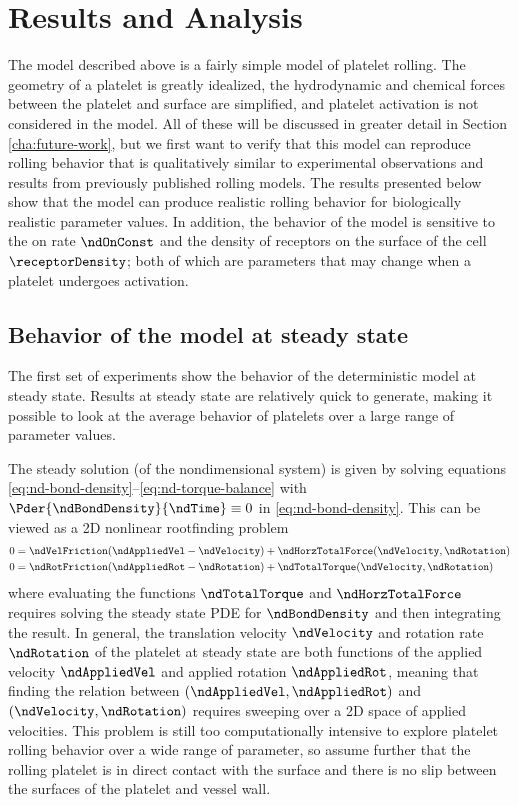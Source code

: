 \section{Results and Analysis}
\label{sec:results}

The model described above is a fairly simple model of platelet
rolling. The geometry of a platelet is greatly idealized, the
hydrodynamic and chemical forces between the platelet and surface are
simplified, and platelet activation is not considered in the
model. All of these will be discussed in greater detail in Section
\ref{cha:future-work}, but we first want to verify that this model can
reproduce rolling behavior that is qualitatively similar to
experimental observations and results from previously published
rolling models. The results presented below show that the model can
produce realistic rolling behavior for biologically realistic
parameter values. In addition, the behavior of the model is sensitive
to the on rate $\ndOnConst$ and the density of receptors on the
surface of the cell $\receptorDensity$; both of which are parameters
that may change when a platelet undergoes activation.

\subsection{Behavior of the model at steady state}
\label{sec:behav-model-steady}

The first set of experiments show the behavior of the deterministic
model at steady state. Results at steady state are relatively quick to
generate, making it possible to look at the average behavior of
platelets over a large range of parameter values. 

The steady solution (of the nondimensional system) is given by solving
equations \eqref{eq:nd-bond-density}--\eqref{eq:nd-torque-balance}
with $\Pder{\ndBondDensity}{\ndTime} \equiv 0$ in
\eqref{eq:nd-bond-density}. This can be viewed as a 2D nonlinear
rootfinding problem
\begin{align}
  \label{eq:2D-ss-translation}
  0 &= \ndVelFriction (\ndAppliedVel - \ndVelocity) +
      \ndHorzTotalForce(\ndVelocity, \ndRotation) \\
  \label{eq:2D-ss-rotation}
  0 &= \ndRotFriction (\ndAppliedRot - \ndRotation) +
      \ndTotalTorque(\ndVelocity, \ndRotation)
\end{align}
where evaluating the functions $\ndTotalTorque$ and
$\ndHorzTotalForce$ requires solving the steady state PDE for
$\ndBondDensity$ and then integrating the result. In general, the
translation velocity $\ndVelocity$ and rotation rate $\ndRotation$ of
the platelet at steady state are both functions of the applied
velocity $\ndAppliedVel$ and applied rotation $\ndAppliedRot$, meaning
that finding the relation between $(\ndAppliedVel, \ndAppliedRot)$ and
$(\ndVelocity, \ndRotation)$ requires sweeping over a 2D space of
applied velocities. This problem is still too computationally
intensive to explore platelet rolling behavior over a wide range of
parameter, so assume further that the rolling platelet is in direct
contact with the surface and there is no slip between the surfaces of
the platelet and vessel wall.

